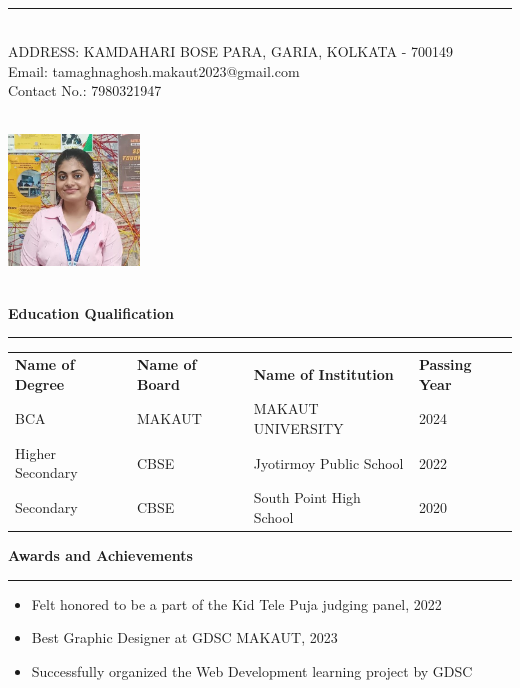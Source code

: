 \documentclass[a4paper,10pt]{article}
\begin{document}
\\
\noindent\rule{\textwidth}{0.5pt}\\
\noindent ADDRESS: KAMDAHARI BOSE PARA, GARIA, KOLKATA - 700149 \\
Email: tamaghnaghosh.makaut2023@gmail.com \\ Contact No.: 7980321947
\begin{flushright}
\includegraphics[width=3.5cm,height=4.5cm]{tamaghna.jpg} %
    
\end{flushright}
\vspace{4mm} %

\noindent \textbf{\large Education Qualification}\\
\vspace{2mm}
\noindent\rule{\textwidth}{0.4pt}
\begin{tabular}{p{4cm} p{4cm} p{4cm} p{4cm}}
 \textbf{Name of Degree} & \textbf{Name of Board } & \textbf{Name of Institution} & \textbf{Passing Year} \\ 
  BCA & MAKAUT & MAKAUT UNIVERSITY & 2024 \\
  Higher Secondary & CBSE & Jyotirmoy Public School & 2022 \\
  Secondary & CBSE & South Point High School & 2020 \\
\end{tabular}

\vspace{4mm}

\noindent \textbf{\large Awards and Achievements}\\[-1em]
\noindent\rule{\textwidth}{0.4pt}
\begin{itemize}[noitemsep]
  \item Felt honored to be a part of the Kid Tele Puja judging panel, 2022
  \item Best Graphic Designer at GDSC MAKAUT, 2023
  \item Successfully organized the Web Development learning project by GDSC
\end{itemize}
\end{document}
